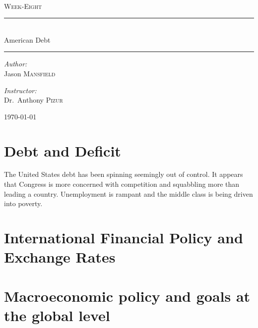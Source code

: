\documentclass[pdftex,10pt,a4paper]{report}
\newcommand{\HRule}{\rule{\linewidth}{0.5mm}}
\begin{document}
%
\begin{titlepage}
\begin{center}
\textsc{\color{Sepia}{\LARGE EC~320}}\\[1.5cm]
\textsc{\Large Week-Eight}
\HRule\\[0.5cm]
{ \huge American Debt}\\[0.4cm]
\HRule 


\begin{minipage}{0.4\textwidth}
\begin{flushleft} \large
\emph{Author:}\\
Jason \textsc{Mansfield}
\end{flushleft}
\end{minipage}
\begin{minipage}{0.4\textwidth}
\begin{flushright} \large
\emph{Instructor:} \\
Dr.~Anthony \textsc{Pizur}
\end{flushright}
\end{minipage}
\vfill

{\large \today}

\end{center}
\end{titlepage}

\section{Debt and Deficit}
\begin{doublespace}
The United States debt has been spinning seemingly out of control. It appears that Congress is more concerned with competition and squabbling more than leading a country. Unemployment is rampant and the middle class is being driven into poverty. 
\end{doublespace} 
\section{International Financial Policy and Exchange Rates }
\section{Macroeconomic policy and goals at the global level}


\clearpage
    \nocite{*}
    
    
\end{document}
